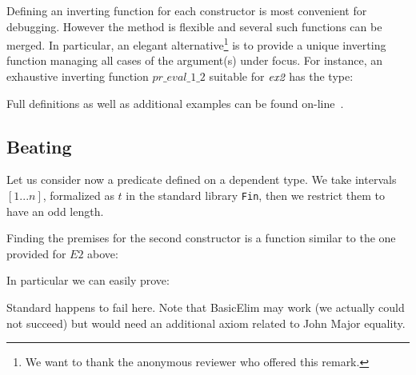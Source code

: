
\medskip
Defining an inverting function for each constructor 
is most convenient for debugging.
However the method is flexible and several such functions can be merged.
In particular, 
an elegant alternative\footnote{%
We want to thank the anonymous reviewer who offered this remark.}
is to provide a unique
inverting function managing all cases of the argument(s) under focus.
For instance, an exhaustive inverting function $pr\_eval\_1\_2$ 
suitable for $\textit{ex2}$ has the type:

\medskip
{}
\medskip

Full definitions as well as additional examples can be found on-line~\cite{hci:examples}.

\subsection{Beating \inversion}
\label{sec:finset}

Let us consider now a predicate defined on a dependent type.
We take intervals $[1...n]$, formalized as $t$ in the standard library \texttt{Fin},
then we restrict them to have an odd length.

\medskip
{}
\medskip

\noindent
Finding the premises for the second constructor is a function 
similar to the one provided for $E2$ above:

\medskip
{}
\medskip

\noindent
In particular we can easily prove:

\medskip
{}
\medskip

\noindent
Standard \inversion happens to fail here.
Note that BasicElim may work (we actually could not succeed)
but would need an additional axiom related to John Major equality.




